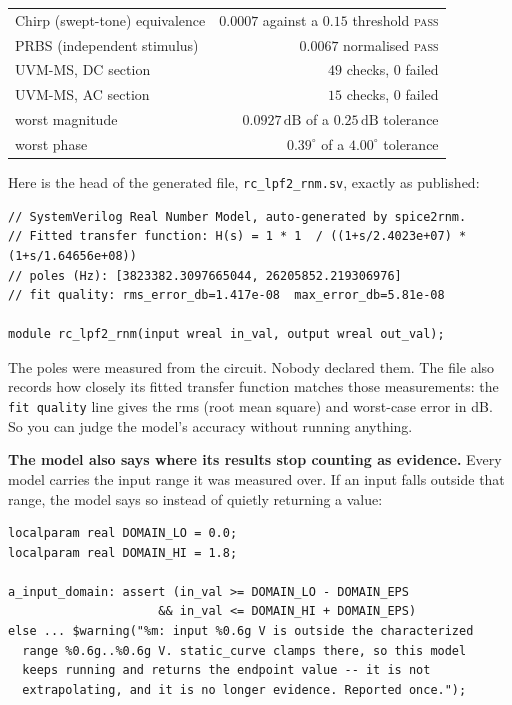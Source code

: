 \documentclass[11pt,a4paper]{article}
\newcommand{\pass}{\textcolor{pass}{\textsc{pass}}}
\newcommand{\unit}[1]{\,\textrm{#1}}
\begin{document}
\begin{center}
\begin{tabular}{@{}lr@{}}
\toprule
Chirp (swept-tone) equivalence & $0.0007$ against a $0.15$ threshold \quad \pass \\
PRBS (independent stimulus) & $0.0067$ normalised \quad \pass \\
\midrule
UVM-MS, DC section          & $49$ checks, $0$ failed \\
UVM-MS, AC section          & $15$ checks, $0$ failed \\
\quad worst magnitude       & $0.0927\unit{dB}$ of a $0.25\unit{dB}$ tolerance \\
\quad worst phase           & $0.39^{\circ}$ of a $4.00^{\circ}$ tolerance \\
\bottomrule
\end{tabular}
\end{center}

\noindent Here is the head of the generated file,
\texttt{rc\_lpf2\_rnm.sv}, exactly as published:

\begin{lstlisting}
// SystemVerilog Real Number Model, auto-generated by spice2rnm.
// Fitted transfer function: H(s) = 1 * 1  / ((1+s/2.4023e+07) * (1+s/1.64656e+08))
// poles (Hz): [3823382.3097665044, 26205852.219306976]
// fit quality: rms_error_db=1.417e-08  max_error_db=5.81e-08

module rc_lpf2_rnm(input wreal in_val, output wreal out_val);
\end{lstlisting}

\noindent The poles were measured from the circuit. Nobody declared
them. The file also records how closely its fitted transfer function
matches those measurements: the \texttt{fit quality} line gives the
rms (root mean square) and worst-case error in dB. So you can judge
the model's accuracy without running anything.

\textbf{The model also says where its results stop counting as
evidence.} Every model carries the input range it was measured over.
If an input falls outside that range, the model says so instead of
quietly returning a value:

\begin{lstlisting}
localparam real DOMAIN_LO = 0.0;
localparam real DOMAIN_HI = 1.8;

a_input_domain: assert (in_val >= DOMAIN_LO - DOMAIN_EPS
                     && in_val <= DOMAIN_HI + DOMAIN_EPS)
else ... $warning("%m: input %0.6g V is outside the characterized
  range %0.6g..%0.6g V. static_curve clamps there, so this model
  keeps running and returns the endpoint value -- it is not
  extrapolating, and it is no longer evidence. Reported once.");
\end{lstlisting}
\end{document}
